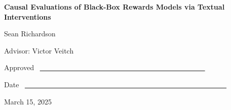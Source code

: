 \documentclass[12pt]{article}
\begin{document}
    \noindent
    \thispagestyle{empty}

    \vspace{1.8in}
    \begin{center}
    {\bf\LARGE Causal Evaluations of Black-Box Rewards Models via Textual Interventions}

    \vspace{1.4in}
    {\Large Sean Richardson}

    \vspace{1.3in}
    {\Large Advisor: Victor Veitch}

    \end{center}

    \vspace{.6in}
    {\Large Approved} ~\underline{~~~~~~~~~~~~~~~~~~
    ~~~~~~~~~~~~~~~~~~~~~~~~~~~~}

    \vspace{.2in}
    {\Large Date} ~\underline{~~~~~~~~~~~~~~~~~~~~~~~~~~~~~~~~~~~~~~~~~~~~~~~~~~~~~~~~~}

    \vfill
    \begin{center}{\large March 15, 2025}\end{center}
    
\end{document}
